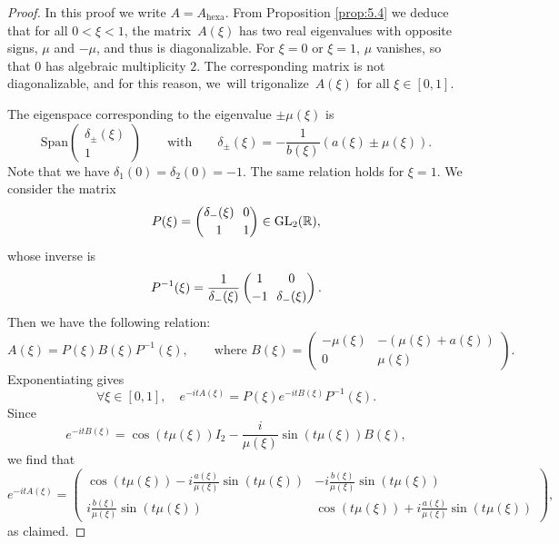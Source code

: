 \documentclass[JEP,XML,SOM,Unicode,NoFloatCountersInSection,published]{cedram}
\theoremstyle{definition}
\newcommand\R{\mathbb R}
\begin{document}
\begin{proof}
In this proof we write $A=A_{\mathrm{hexa}}$. From Proposition \ref{prop:5.4} we deduce that for all ${0 < \xi < 1}$, the matrix~$A(\xi)$ has two real eigenvalues with opposite signs, $\mu$ and $-\mu$, and thus is diagonalizable. For $\xi =0$ or $\xi = 1$, $\mu$ vanishes, so that $0$ has algebraic multiplicity $2$. The corresponding matrix is not diagonalizable, and for this reason, we~will trigonalize~$A(\xi)$ for all $\xi \in [0,1]$.

The eigenspace corresponding to the eigenvalue $\pm \mu(\xi)$ is
\[
\text{Span}\begin{pmatrix} \delta_{\pm}(\xi) \\[2pt] 1 \end{pmatrix} \qquad \text{with} \qquad
\delta_{\pm}(\xi) = -\frac{1}{b(\xi)}(a(\xi) \pm \mu(\xi)).
\]
Note that we have $\delta_1(0) = \delta_2(0) = -1$. The same relation holds for $\xi = 1$.
We consider the matrix
\[\arraycolsep3.5pt
P(\xi) = \begin{pmatrix} \delta_-(\xi) & 0 \\[2pt] 1 & 1 \end{pmatrix} \in \mathrm{GL}_2(\R),
\]
whose inverse is
\[\arraycolsep3.5pt
P^{-1}(\xi) = \frac{1}{\delta_-(\xi)} \begin{pmatrix} 1 & 0 \\[2pt] -1 & \delta_-(\xi) \end{pmatrix}.
\]
Then we have the following relation:
\begin{equation}\label{tridiag_A}
A(\xi) = P(\xi)B(\xi) P^{-1}(\xi), \qquad \text{where }
B(\xi) = \begin{pmatrix} -\mu(\xi) & -(\mu(\xi)+a(\xi)) \\[2pt] 0 & \mu(\xi) \end{pmatrix}.
\end{equation}
Exponentiating gives
\begin{equation*}
\forall \xi\in[0,1], \quad e^{-itA(\xi)} = P(\xi)e^{-itB(\xi)} P^{-1}(\xi).
\end{equation*}
Since
\begin{equation*}
e^{-itB(\xi)} = \cos(t\mu(\xi)) I_2 - \frac{i}{\mu(\xi)}\sin(t\mu(\xi)) B(\xi),
\end{equation*}
we find that
\begin{equation*}
e^{-itA(\xi)} = \begin{pmatrix} \cos(t\mu(\xi)) - i\frac{a(\xi)}{\mu(\xi)}\sin(t\mu(\xi)) & -i\frac{b(\xi)}{\mu(\xi)}\sin(t\mu(\xi)) \\[6pt] i\frac{b(\xi)}{\mu(\xi)}\sin(t\mu(\xi)) & \cos(t\mu(\xi)) + i\frac{a(\xi)}{\mu(\xi)}\sin(t\mu(\xi)) \end{pmatrix},
\end{equation*}
as claimed.
\end{proof}
\end{document}
